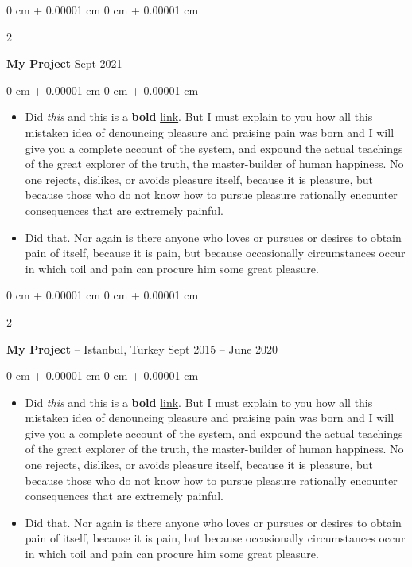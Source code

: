 \documentclass[10pt, letterpaper]{article}
\newenvironment{highlights}{
    \begin{itemize}[
        topsep=0.10 cm,
        parsep=0.10 cm,
        partopsep=0pt,
        itemsep=0pt,
        leftmargin=0 cm + 10pt
    ]
}{
    \end{itemize}
} %
\newenvironment{onecolentry}{
    \begin{adjustwidth}{
        0 cm + 0.00001 cm
    }{
        0 cm + 0.00001 cm
    }
}{
    \end{adjustwidth}
} %
\newenvironment{twocolentry}[2][]{
    \onecolentry
    \def\secondColumn{#2}
    \setcolumnwidth{\fill, 4.5 cm}
    \begin{paracol}{2}
}{
    \switchcolumn \raggedleft \secondColumn
    \end{paracol}
    \endonecolentry
} %
\begin{document}
        \vspace{0.2 cm}

        \begin{twocolentry}{
            Sept 2021
        }
            \textbf{My Project}\end{twocolentry}

        \vspace{0.10 cm}
        \begin{onecolentry}
            \begin{highlights}
                \item Did \textit{this} and this is a \textbf{bold} \href{https://example.com}{link}. But I must explain to you how all this mistaken idea of denouncing pleasure and praising pain was born and I will give you a complete account of the system, and expound the actual teachings of the great explorer of the truth, the master-builder of human happiness. No one rejects, dislikes, or avoids pleasure itself, because it is pleasure, but because those who do not know how to pursue pleasure rationally encounter consequences that are extremely painful.
                \item Did that. Nor again is there anyone who loves or pursues or desires to obtain pain of itself, because it is pain, but because occasionally circumstances occur in which toil and pain can procure him some great pleasure.
            \end{highlights}
        \end{onecolentry}


        \vspace{0.2 cm}

        \begin{twocolentry}{
            Sept 2015 – June 2020
        }
            \textbf{My Project} -- Istanbul, Turkey\end{twocolentry}

        \vspace{0.10 cm}
        \begin{onecolentry}
            \begin{highlights}
                \item Did \textit{this} and this is a \textbf{bold} \href{https://example.com}{link}. But I must explain to you how all this mistaken idea of denouncing pleasure and praising pain was born and I will give you a complete account of the system, and expound the actual teachings of the great explorer of the truth, the master-builder of human happiness. No one rejects, dislikes, or avoids pleasure itself, because it is pleasure, but because those who do not know how to pursue pleasure rationally encounter consequences that are extremely painful.
                \item Did that. Nor again is there anyone who loves or pursues or desires to obtain pain of itself, because it is pain, but because occasionally circumstances occur in which toil and pain can procure him some great pleasure.
            \end{highlights}
        \end{onecolentry}
\end{document}
